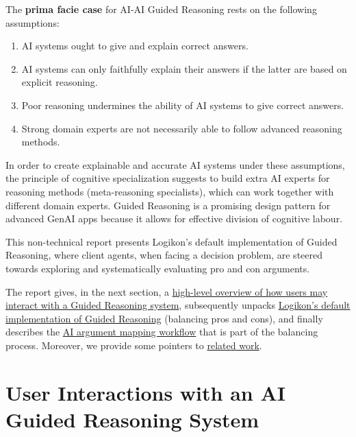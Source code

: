 \documentclass[
  letterpaper,
  DIV=11,
  numbers=noendperiod]{scrartcl}
\providecommand{\tightlist}{%
  \setlength{\itemsep}{0pt}\setlength{\parskip}{0pt}}\usepackage{longtable,booktabs,array}
\begin{document}
The \textbf{prima facie case} for AI-AI Guided Reasoning rests on the
following assumptions:

\begin{enumerate}
\def\labelenumi{\arabic{enumi}.}
\tightlist
\item
  AI systems ought to give and explain correct answers.
\item
  AI systems can only faithfully explain their answers if the latter are
  based on explicit reasoning.
\item
  Poor reasoning undermines the ability of AI systems to give correct
  answers.
\item
  Strong domain experts are not necessarily able to follow advanced
  reasoning methods.
\end{enumerate}

In order to create explainable and accurate AI systems under these
assumptions, the principle of cognitive specialization suggests to build
extra AI experts for reasoning methods (meta-reasoning specialists),
which can work together with different domain experts. Guided Reasoning
is a promising design pattern for advanced GenAI apps because it allows
for effective division of cognitive labour.

This non-technical report presents Logikon's default implementation of
Guided Reasoning, where client agents, when facing a decision problem,
are steered towards exploring and systematically evaluating pro and con
arguments.

The report gives, in the next section, a
\protect\hyperlink{user-interactions-with-an-ai-guided-reasoning-system}{high-level
overview of how users may interact with a Guided Reasoning system},
subsequently unpacks
\protect\hyperlink{guiding-client-reasoners-in-balancing-pros-and-cons}{Logikon's
default implementation of Guided Reasoning} (balancing pros and cons),
and finally describes the
\protect\hyperlink{informal-argument-mapping-workflow}{AI argument
mapping workflow} that is part of the balancing process. Moreover, we
provide some pointers to \protect\hyperlink{related-work}{related work}.

\hypertarget{user-interactions-with-an-ai-guided-reasoning-system}{%
\section{User Interactions with an AI Guided Reasoning
System}\label{user-interactions-with-an-ai-guided-reasoning-system}}
\end{document}
